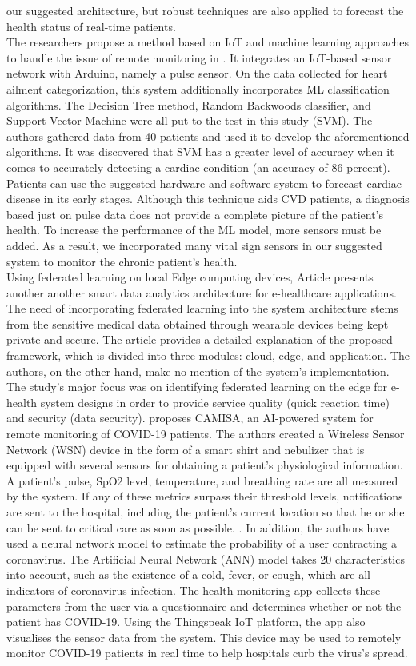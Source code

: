 \documentclass{bmcart}
\begin{document}
our suggested architecture, but robust techniques are also applied to forecast
the health status of real-time patients.\\
The researchers propose a method based on IoT and machine learning approaches to
handle the issue of remote monitoring in \cite{9167660}. It integrates an IoT-based sensor
network with Arduino, namely a pulse sensor. On the data collected for heart
ailment categorization, this system additionally incorporates ML classification
algorithms. The Decision Tree method, Random Backwoods classifier, and Support
Vector Machine were all put to the test in this study (SVM). The authors
gathered data from 40 patients and used it to develop the aforementioned
algorithms. It was discovered that SVM has a greater level of accuracy when it
comes to accurately detecting a cardiac condition (an accuracy of 86 percent).
Patients can use the suggested hardware and software system to forecast cardiac
disease in its early stages. Although this technique aids CVD patients, a
diagnosis based just on pulse data does not provide a complete picture of the
patient's health. To increase the performance of the ML model, more sensors must
be added. As a result, we incorporated many vital sign sensors in our suggested
system to monitor the chronic patient's health.\\
Using federated learning on local Edge computing devices, Article \cite{9377873} presents
another another smart data analytics architecture for e-healthcare applications.
The need of incorporating federated learning into the system architecture stems
from the sensitive medical data obtained through wearable devices being kept
private and secure. The article provides a detailed explanation of the proposed
framework, which is divided into three modules: cloud, edge, and application.
The authors, on the other hand, make no mention of the system's implementation.
The study's major focus was on identifying federated learning on the edge for
e-health system designs in order to provide service quality (quick reaction
time) and security (data security).\cite{gbha} proposes CAMISA, an AI-powered system for
remote monitoring of COVID-19 patients. The authors created a Wireless Sensor
Network (WSN) device in the form of a smart shirt and nebulizer that is equipped
with several sensors for obtaining a patient's physiological information. A
patient's pulse, SpO2 level, temperature, and breathing rate are all measured by
the system. If any of these metrics surpass their threshold levels,
notifications are sent to the hospital, including the patient's current location
so that he or she can be sent to critical care as soon as possible. . In
addition, the authors have used a neural network model to estimate the
probability of a user contracting a coronavirus. The Artificial Neural Network
(ANN) model takes 20 characteristics into account, such as the existence of a
cold, fever, or cough, which are all indicators of coronavirus infection. The
health monitoring app collects these parameters from the user via a
questionnaire and determines whether or not the patient has COVID-19. Using the
Thingspeak IoT platform, the app also visualises the sensor data from the
system. This device may be used to remotely monitor COVID-19 patients in real
time to help hospitals curb the virus's spread.
\end{document}
